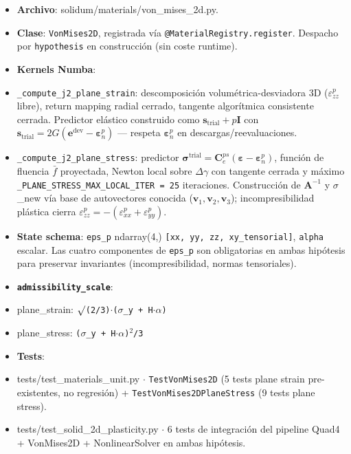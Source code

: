 \documentclass[11pt,letterpaper,oneside]{report}
\begin{document}
\begin{itemize}
  \item \textbf{Archivo}: solidum/materials/von\_mises\_2d.py.
  \item \textbf{Clase}: \texttt{VonMises2D}, registrada vía \texttt{@MaterialRegistry.register}. Despacho por \texttt{hypothesis} en construcción (sin coste runtime).
  \item \textbf{Kernels Numba}:
  \item \texttt{\_compute\_j2\_plane\_strain}: descomposición volumétrica-desviadora 3D ($\varepsilon^p_{zz}$ libre), return mapping radial cerrado, tangente algorítmica consistente cerrada. Predictor elástico construido como $\mathbf s_\text{trial} + p\mathbf I$ con $\mathbf s_\text{trial} = 2G(\mathbf e^\text{dev} - \boldsymbol\varepsilon^p_n)$ --- respeta $\boldsymbol\varepsilon^p_n$ en descargas/reevaluaciones.
  \item \texttt{\_compute\_j2\_plane\_stress}: predictor $\boldsymbol\sigma^\text{trial} = \mathbf C^{ps}_e(\boldsymbol\varepsilon - \boldsymbol\varepsilon^p_n)$, función de fluencia $\bar f$ proyectada, Newton local sobre $\Delta\gamma$ con tangente cerrada y máximo \texttt{\_PLANE\_STRESS\_MAX\_LOCAL\_ITER = 25} iteraciones. Construcción de $\mathbf A^{-1}$ y \ensuremath{\sigma}\_new vía base de autovectores conocida ($\mathbf v_1, \mathbf v_2, \mathbf v_3$); incompresibilidad plástica cierra $\varepsilon^p_{zz} = -(\varepsilon^p_{xx} + \varepsilon^p_{yy})$.
  \item \textbf{State schema}: \texttt{eps\_p} ndarray(4,) \texttt{[xx, yy, zz, xy\_tensorial]}, \texttt{alpha} escalar. Las cuatro componentes de \texttt{eps\_p} son obligatorias en ambas hipótesis para preservar invariantes (incompresibilidad, normas tensoriales).
  \item \textbf{\texttt{admissibility\_scale}}:
  \item plane\_strain: \texttt{\ensuremath{\surd}(2/3)\ensuremath{\cdot}(\ensuremath{\sigma}\_y + H\ensuremath{\cdot}\ensuremath{\alpha})}
  \item plane\_stress: \texttt{(\ensuremath{\sigma}\_y + H\ensuremath{\cdot}\ensuremath{\alpha})\ensuremath{^{2}}/3}
  \item \textbf{Tests}:
  \item tests/test\_materials\_unit.py \ensuremath{\cdot} \texttt{TestVonMises2D} (5 tests plane strain pre-existentes, no regresión) + \texttt{TestVonMises2DPlaneStress} (9 tests plane stress).
  \item tests/test\_solid\_2d\_plasticity.py \ensuremath{\cdot} 6 tests de integración del pipeline Quad4 + VonMises2D + NonlinearSolver en ambas hipótesis.

\end{itemize}
\end{document}
